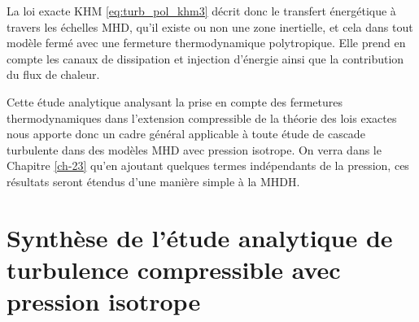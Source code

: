 La loi exacte \acs{KHM} \eqref{eq:turb_pol_khm3} décrit donc le transfert énergétique à travers les échelles \ac{MHD}, qu'il existe ou non une zone inertielle, et cela dans tout modèle fermé avec une fermeture thermodynamique polytropique. Elle prend en compte les canaux de dissipation et injection d'énergie ainsi que la contribution du flux de chaleur. 

Cette étude analytique analysant la prise en compte des fermetures thermodynamiques dans l'extension compressible de la théorie des lois exactes nous apporte donc un cadre général applicable à toute étude de cascade turbulente dans des modèles \ac{MHD} avec pression isotrope. On verra dans le Chapitre \ref{ch-23} qu'en ajoutant quelques termes indépendants de la pression, ces résultats seront étendus d'une manière simple à la \acs{MHDH}.

\newpage
\section{Synthèse de l'étude analytique de turbulence compressible avec pression isotrope}
\label{synt-13}

